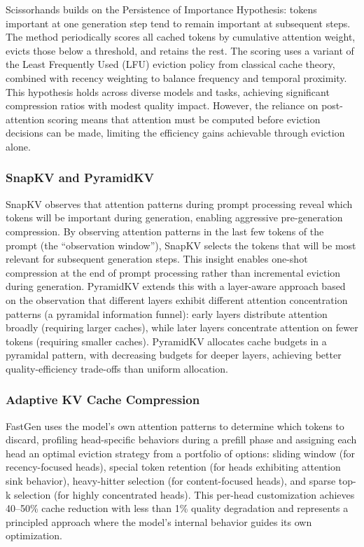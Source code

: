 \documentclass[11pt,letterpaper]{article}
\begin{document}
Scissorhands \cite{liu2023scissorhands} builds on the Persistence of Importance Hypothesis: tokens important at one generation step tend to remain important at subsequent steps. The method periodically scores all cached tokens by cumulative attention weight, evicts those below a threshold, and retains the rest. The scoring uses a variant of the Least Frequently Used (LFU) eviction policy from classical cache theory, combined with recency weighting to balance frequency and temporal proximity. This hypothesis holds across diverse models and tasks, achieving significant compression ratios with modest quality impact. However, the reliance on post-attention scoring means that attention must be computed before eviction decisions can be made, limiting the efficiency gains achievable through eviction alone.

\subsubsection{SnapKV and PyramidKV}

SnapKV \cite{li2024snapkv} observes that attention patterns during prompt processing reveal which tokens will be important during generation, enabling aggressive pre-generation compression. By observing attention patterns in the last few tokens of the prompt (the ``observation window''), SnapKV selects the tokens that will be most relevant for subsequent generation steps. This insight enables one-shot compression at the end of prompt processing rather than incremental eviction during generation. PyramidKV \cite{cai2024pyramidkv} extends this with a layer-aware approach based on the observation that different layers exhibit different attention concentration patterns (a pyramidal information funnel): early layers distribute attention broadly (requiring larger caches), while later layers concentrate attention on fewer tokens (requiring smaller caches). PyramidKV allocates cache budgets in a pyramidal pattern, with decreasing budgets for deeper layers, achieving better quality-efficiency trade-offs than uniform allocation.

\subsubsection{Adaptive KV Cache Compression}

FastGen \cite{ge2024model} uses the model's own attention patterns to determine which tokens to discard, profiling head-specific behaviors during a prefill phase and assigning each head an optimal eviction strategy from a portfolio of options: sliding window (for recency-focused heads), special token retention (for heads exhibiting attention sink behavior), heavy-hitter selection (for content-focused heads), and sparse top-k selection (for highly concentrated heads). This per-head customization achieves 40--50\% cache reduction with less than 1\% quality degradation and represents a principled approach where the model's internal behavior guides its own optimization.
\end{document}
